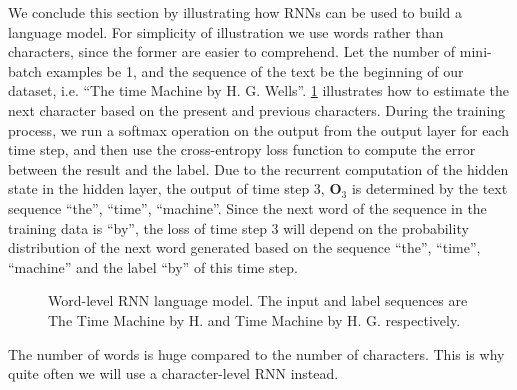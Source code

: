 We conclude this section by illustrating how RNNs can be used to build a language model. For simplicity of illustration we use words rather than characters, since the former are easier to comprehend. Let the number of mini-batch examples be 1, and the sequence of the text be the beginning of our dataset, i.e. “The time Machine by H. G. Wells”. \cref{fig:rnn-train} illustrates how to estimate the next character based on the present and previous characters. During the training process, we run a softmax operation on the output from the output layer for each time step, and then use the cross-entropy loss function to compute the error between the result and the label. Due to the recurrent computation of the hidden state in the hidden layer, the output of time step 3, $\mathbf{O}_3$ is determined by the text sequence “the”, “time”, “machine”. Since the next word of the sequence in the training data is “by”, the loss of time step 3 will depend on the probability distribution of the next word generated based on the sequence “the”, “time”, “machine” and the label “by” of this time step.

\begin{figure}[hpt]
	\centering
	
	\caption{Word-level RNN language model. The input and label sequences are The Time Machine by H. and Time Machine by H. G. respectively.}
	\label{fig:rnn-train}
\end{figure}


The number of words is huge compared to the number of characters. This is why quite often we will use a character-level RNN instead.




